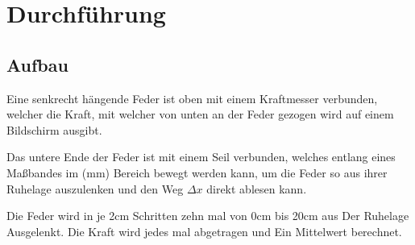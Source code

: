 \section{Durchführung}
\label{sec:Durchführung}

\subsection{Aufbau}
Eine senkrecht hängende Feder ist oben mit einem Kraftmesser verbunden, welcher
die Kraft, mit welcher von unten an der Feder gezogen wird auf einem 
Bildschirm ausgibt.


Das untere Ende der Feder ist mit einem Seil verbunden, welches entlang eines 
Maßbandes im (mm) Bereich bewegt werden kann, um die Feder so aus ihrer 
Ruhelage auszulenken und den Weg $\Delta x$ direkt ablesen kann.


Die Feder wird in je 2cm Schritten zehn mal von 0cm bis 20cm aus Der Ruhelage 
Ausgelenkt. Die Kraft wird jedes mal abgetragen und Ein Mittelwert berechnet.